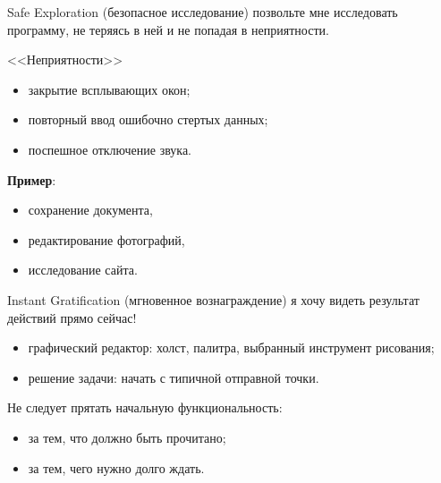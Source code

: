 \documentclass{beamer}
\begin{document}
\begin{frame}[t]	
	\begin{block}{Safe Exploration (безопасное исследование)}
		 позвольте мне исследовать программу, не теряясь в ней и не попадая в неприятности.		 
	\end{block}
	<<Неприятности>>
	\begin{itemize}
		\item закрытие всплывающих окон;
		\item повторный ввод ошибочно стертых данных;
		\item поспешное отключение звука.				
	\end{itemize}
	\textbf{Пример}: 
	\begin{itemize}
		\item сохранение документа,
		\item редактирование фотографий, 
		\item исследование сайта.				
	\end{itemize}	
\end{frame}

\begin{frame}[t]	
	\begin{block}{Instant Gratification (мгновенное вознаграждение)}
		 я хочу видеть результат действий прямо сейчас!
	\end{block}
	\begin{itemize}
		\item графический редактор: холст, палитра, выбранный инструмент рисования;
		\item решение задачи: начать с типичной отправной точки.
	\end{itemize}
	Не следует прятать начальную функциональность:
	\begin{itemize}
		\item за тем, что должно быть прочитано;
		\item за тем, чего нужно долго ждать.	
	\end{itemize}	
\end{frame}
\end{document}
